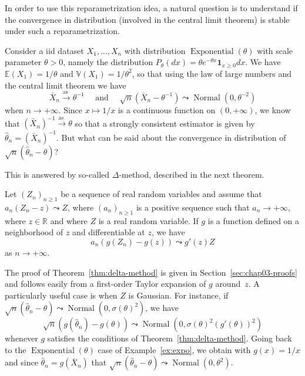 \documentclass[
	fontsize=11pt, %
	twoside=false, %
	numbers=noenddot, %
]{kaobook}
\DeclareMathOperator{\expo}{Exponential}
\DeclareMathOperator{\nor}{Normal}
\newcommand{\E}{\mathbb E}
\newcommand{\R}{\mathbb R}
\newcommand{\var}{\mathbb V}
\newcommand{\wh}{\widehat}
\newcommand{\ind}[1]{\mathbf 1_{#1}}
\newcommand{\goes}{\rightarrow}
\newcommand{\goas}{\overset{\text{as\ }}{\rightarrow}}
\begin{document}
In order to use this reparametrization idea, a natural question is to understand if the convergence in distribution (involved in the central limit theorem) is stable under such a reparametrization.
\begin{example}
	\label{ex:expo}
	Consider a iid dataset $X_1, \ldots, X_n$ with distribution $\expo(\theta)$ with scale parameter $\theta > 0$, namely the distribution $P_\theta(dx) = \theta e^{-\theta x} \ind{x \geq 0} dx$. 
	We have $\E(X_1) = 1 / \theta$ and $\var(X_1) = 1 / \theta^2$, so that using the law of large numbers and the central limit theorem we have
	\begin{equation*}
		\bar X_n \goas \theta^{-1} \quad \text{ and } \quad \sqrt n (\bar X_n - \theta^{-1}) \leadsto \nor(0, \theta^{-2})
	\end{equation*}
	when $n \rightarrow +\infty$.
	Since $x \mapsto 1 / x$ is a continuous function on $(0, +\infty)$, we know that $(\bar X_n)^{-1} \goas \theta$ so that a strongly consistent estimator is given by $\wh \theta_n = (\bar X_n)^{-1}$.
	But what can be said about the convergence in distribution of $\sqrt n (\wh \theta_n - \theta)$?
\end{example}
This is answered by so-called $\Delta$-method, described in the next theorem.
\begin{theorem}
	\label{thm:delta-method}
 	Let $(Z_n)_{n \geq 1}$ be a sequence of real random variables and assume that 
	$a_n(Z_n - z) \leadsto Z$, where $(a_n)_{n \geq 1}$ is a positive sequence such that $a_n \goes +\infty$, where $z \in \R$ and where $Z$ is a real random variable.
 	If $g$ is a function defined on a neighborhood of $z$ and differentiable at $z$, we have 
 	\begin{equation}
 		a_n (g(Z_n) - g(z)) \leadsto g'(z) Z
 	\end{equation}
 	as $n \goes +\infty$.
\end{theorem}
The proof of Theorem~\ref{thm:delta-method} is given in Section~\ref{sec:chap03-proofs} and follows easily from a first-order Taylor expansion of $g$ around~$z$.
A particularly useful case is when $Z$ is Gaussian.
For instance, if $\sqrt n (\wh \theta_n - \theta) \leadsto \nor(0, \sigma(\theta)^2)$, we have
\begin{equation*}
	\sqrt n (g(\wh \theta_n) - g(\theta)) \leadsto 
	\nor(0, \sigma(\theta)^2 (g'(\theta))^2)
\end{equation*}
whenever $g$ satisfies the conditions of Theorem~\ref{thm:delta-method}.
Going back to the $\expo(\theta)$ case of Example~\ref{ex:expo}, we obtain with $g(x) = 1 / x$ and since $\wh \theta_n = g(\bar X_n)$ that $\sqrt n (\wh \theta_n - \theta) \leadsto \nor(0, \theta^2)$.
\end{document}
